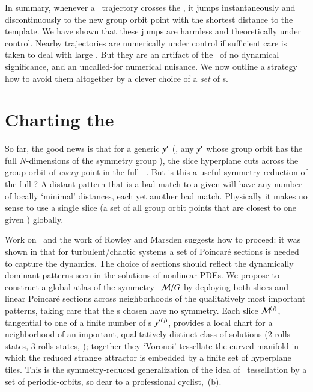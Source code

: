 \documentclass[preprint,12pt]{elsarticle} %
\begin{document}
In summary, whenever a \reducedsp\ trajectory crosses the {\sset}, it
jumps instantaneously and discontinuously to the new group orbit point
with the shortest distance to the template. We
have shown that these jumps are harmless and theoretically under control.
Nearby trajectories are numerically under control if sufficient care is
taken to deal with large \angVels. But they are an artifact of the
\mslices\ of no dynamical significance, and an uncalled-for numerical
nuisance. We now outline a strategy how to avoid them altogether by a
clever choice of a {\em set} of {\template s}.


\section{Charting the \reducedsp}
	\label{sec:chart}

So far, the good news is that for a generic {\template} ${y'}$ (\ie,
any ${y'}$ whose group orbit has the full $N$-dimensions of the
symmetry group \Group), the slice hyperplane  cuts across
the group orbit of {\em every} point in the full \statesp\ \pS. But is
this a useful symmetry reduction of the full \statesp? A distant pattern
that is a bad match to a given {\template} will have any number of
locally `minimal' distances, each yet another bad match. Physically it
makes no sense to use a single slice (a set of all group orbit points
that are closest to one given {\template}) globally.

Work on \KS\ and the work of Rowley and
Marsden suggests how to proceed: it was
shown in  that for turbulent/chaotic systems a
set of Poincar\'e sections is needed to capture the dynamics. The choice
of sections should reflect the dynamically dominant patterns seen in the
solutions of nonlinear PDEs. We propose to construct a global atlas of
the symmetry \reducedsp\ ${\cal M}/G$ by deploying both slices and
linear Poincar\'e sections across neighborhoods of the qualitatively most
important patterns, taking care that the {\template s} chosen have no
symmetry. Each slice $\bar{\cal M}{}^{(j)}$, tangential to one of a finite
number of {\template s}  ${y'}{}^{(j)}$, provides a local chart for a
neighborhood of an important, qualitatively distinct class of solutions
(2-rolls states, 3-rolls states, \etc); together they `Voronoi'
tessellate  the curved manifold in which the reduced strange attractor is
embedded by a finite set of hyperplane
tiles. This is the symmetry-reduced
generalization of the idea of {\statesp\ tessellation} by a set of
periodic-orbits, so dear to a professional cyclist,
\,(b).
\end{document}
